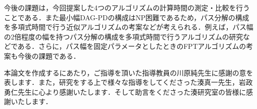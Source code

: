 \documentclass{kuisthesis}           %
\begin{document}
今後の課題は，今回提案した4つのアルゴリズムの計算時間の測定・比較を行うことである．また最小幅DAG-PDの構成はNP困難であるため，パス分解の構成を多項式時間で行う近似アルゴリズムの考案などが考えられる．例えば，パス幅の2倍程度の幅を持つパス分解の構成を多項式時間で行うアルゴリズムの研究などである．さらに，パス幅を固定パラメータとしたときのFPTアルゴリズムの考案も今後の課題である．


\acknowledgments				%
本論文を作成するにあたり，ご指導を頂いた指導教員の川原純先生に感謝の意を表します．また，研究をする上で様々な指導をしてくださった湊真一先生，岩政勇仁先生に心より感謝いたします．そして助言をくださった湊研究室の皆様に感謝いたします．

\nocite{*}
\end{document}
